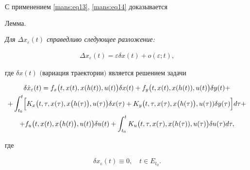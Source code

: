 С применением \eqref{mans:eq13}, \eqref{mans:eq14} доказывается



\smallskip

{\small \sc Лемма.}

\em   Для $ \Delta x_{\varepsilon}  (t)$  справедливо следующее разложение\em\/: \em

\begin{gather}

\label{mans:eq15}

 \Delta x_{\varepsilon} (t) = \varepsilon  \delta x(t)+o(\varepsilon ; t),

 \end{gather}

 где $ \delta x(t) $  $($вариация траектории$)$ является решением задачи

 \begin{multline}

 \label{mans:eq16}

\delta \dot{x}_{\varepsilon}(t)=f_{x} \bigl(t, x(t), x(h(t)), u(t)\bigr) \delta x(t)+

f_{y} \bigl(t, x(t), x(h(t)), u(t)\bigr) \delta y(t)+

\\

 +\int_{t_{0}}^{t} \Bigl[ K_{x} \bigl(t, \tau, x(\tau), x\bigl(h(\tau)\bigr), u(\tau)\bigr) \delta x(\tau) + 

 K_{y} \bigl(t, \tau, x(\tau), x\bigl(h(\tau)\bigr), u(\tau)) \delta y(\tau) \Bigr]  d\tau +  \\

 +f_{u} \bigl(t, x(t), x\bigl(h(t)\bigr), u(t)\bigr) \delta u(t)+\int_{t_{0}}^{t} K_{u}\bigl(t, \tau, x(\tau), x(h(\tau)), u(\tau)\bigr) \delta u(\tau) d\tau ,

\end{multline}

 где 

\begin{gather}

\label{mans:eq17}

\delta x_{\varepsilon}(t)\equiv 0, \quad  t\in E_{t_{0}} .

\end{gather}

\em



\smallskip







